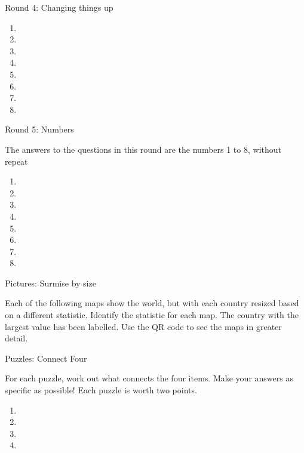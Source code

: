 \newpage
\begin{center}
\Huge
Round 4: Changing things up
\end{center}
\large
\Huge
\begin{enumerate}
\item
\item
\item
\item
\item
\item
\item
\item
\end{enumerate}

\newpage
\begin{center}
\Huge
Round 5: Numbers
\end{center}
\large
The answers to the questions in this round are the numbers 1 to 8, without repeat

\Huge
\begin{enumerate}
\item
\item
\item
\item
\item
\item
\item
\item
\end{enumerate}

\newpage
\begin{center}
\Huge
Pictures: Surmise by size
\end{center}
\large
Each of the following maps show the world, but with each country resized based on a different statistic. Identify the statistic for each map. The country with the largest value has been labelled. Use the QR code to see the maps in greater detail.


\newpage
\begin{center}
\Huge
Puzzles: Connect Four
\end{center}
\large
For each puzzle, work out what connects the four items. Make your answers as specific as possible! Each puzzle is worth two points.

\large
\begin{enumerate}
\item 
\item 
\item 
\item 
\end{enumerate}

